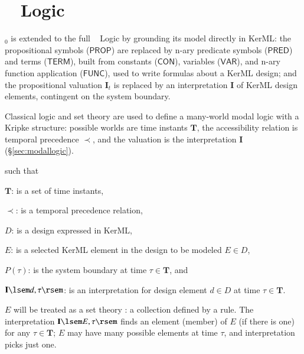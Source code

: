  \section{\logicid~ Logic}\label{sec:bl}

 \logicid$_0$ is extended to the full \logicid~ Logic by grounding its model directly in KerML: the propositional symbols ($\mathsf{PROP}$) are replaced by n-ary predicate symbols ($\mathsf{PRED}$) and terms ($\mathsf{TERM}$), built from constants ($\mathsf{CON}$), variables ($\mathsf{VAR}$), and n-ary function application ($\mathsf{FUNC}$), used to write formulas about a KerML design; and the propositional valuation $\mathbf{I}_t$ is replaced by an interpretation $\mathbf{I}$ of KerML design elements, contingent on the system boundary.

 \pn Classical logic and set theory are used to define a many-world modal logic with a Kripke structure: possible worlds are time instants $\mathbf{T}$, the accessibility relation is temporal precedence $\prec$, and the valuation is the interpretation $\mathbf{I}$ (\S\ref{sec:modallogic}).

 \dfmodel
such that

$\mathbf{T}$: is a set of time instants,

$\prec$: is a temporal precedence relation,

$D$: is a design expressed in KerML,

$E$: is a selected KerML element in the design to be modeled $E \in D$,

$P(\tau)$: is the system boundary at time $\tau \in \mathbf{T}$, and

$\mathbf{I}\lsem d,\tau\rsem$: is an interpretation for design element $d\in D$ at time $\tau \in \mathbf{T}$.

\pn $E$ will be treated as a set theory : a collection defined by a rule.  The interpretation $\mathbf{I}\lsem E,\tau\rsem$ finds an element (member) of $E$ (if there is one) for any $\tau \in \mathbf{T}$; $E$ may have many possible elements at time $\tau$, and interpretation picks just one.

